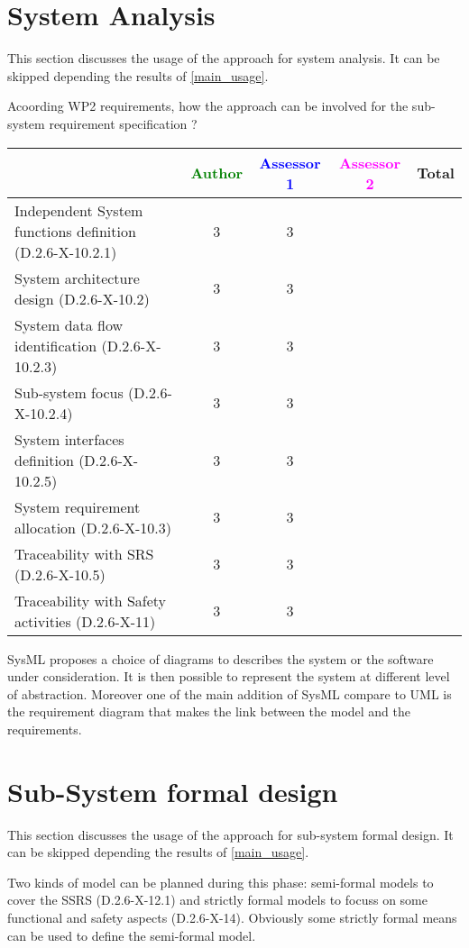 \section{System Analysis}
This section discusses the usage of the approach for system analysis.
It can be skipped depending the results of \ref{main_usage}.

Acoording WP2 requirements, how the approach can be involved for the sub-system requirement specification ?

\begin{tabular}{|l | c | c | c | c|}
\hline
& \textcolor{green}{Author} & \textcolor{blue}{Assessor 1} & \textcolor{magenta}{Assessor 2} & Total \\
\hline
Independent System functions definition (D.2.6-X-10.2.1)  &3 & 3& &  \\
\hline 
System architecture design (D.2.6-X-10.2) &3 & 3& &  \\
\hline
System data flow identification (D.2.6-X-10.2.3)  &3 & 3& &  \\
\hline
Sub-system focus (D.2.6-X-10.2.4)  &3 & 3& &  \\
\hline
System interfaces definition (D.2.6-X-10.2.5)  &3 & 3& &  \\
\hline
System requirement allocation (D.2.6-X-10.3)  &3 & 3& &  \\
\hline
Traceability with SRS (D.2.6-X-10.5)  &3 & 3& &  \\
\hline
Traceability with Safety activities (D.2.6-X-11)  &3 & 3& &  \\
\hline
\end{tabular}
\begin{author_comment}
  SysML proposes a choice of diagrams to describes the system or the
  software under consideration. It is then possible to represent the
  system at different level of abstraction. Moreover one of the main
  addition of SysML compare to UML is the requirement diagram that
  makes the link between the model and the requirements.
\end{author_comment}


\section{Sub-System formal design}
This section discusses the usage of the approach for sub-system formal design.
It can be skipped depending the results of \ref{main_usage}.

Two kinds of model can be planned during this phase: semi-formal models to  cover the SSRS (D.2.6-X-12.1) and strictly formal  models to  focuss on some functional and safety aspects (D.2.6-X-14).  Obviously some strictly  formal means can be used to define the semi-formal  model.

